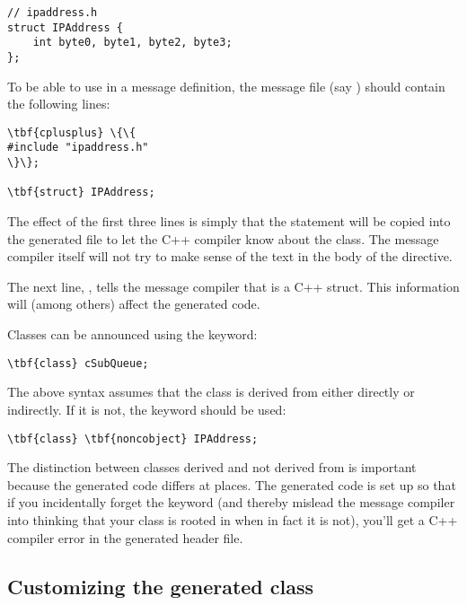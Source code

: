 \begin{verbatim}
// ipaddress.h
struct IPAddress {
    int byte0, byte1, byte2, byte3;
};
\end{verbatim}

To be able to use  in a message definition, the message
file (say ) should contain the following lines:

\begin{Verbatim}[commandchars=\\\{\}]
\tbf{cplusplus} \{\{
#include "ipaddress.h"
\}\};

\tbf{struct} IPAddress;
\end{Verbatim}

The effect of the first three lines is simply that the 
statement will be copied into the generated 
file to let the C++ compiler know about the  class.
The message compiler itself will not try to make sense of the
text in the body of the  directive.

The next line, , tells the message compiler that
 is a C++ struct. This information will (among others)
affect the generated code.

Classes can be announced using the  keyword:

\begin{Verbatim}[commandchars=\\\{\}]
\tbf{class} cSubQueue;
\end{Verbatim}

The above syntax assumes that the class is derived from 
either directly or indirectly. If it is not, the 
keyword should be used:

\begin{Verbatim}[commandchars=\\\{\}]
\tbf{class} \tbf{noncobject} IPAddress;
\end{Verbatim}

The distinction between classes derived and not derived from 
is important because the generated code differs at places.
The generated code is set up so that if you incidentally
forget the  keyword (and thereby mislead the
message compiler into thinking that your class is rooted in
 when in fact it is not), you'll get a C++ compiler
error in the generated header file.


\subsection{Customizing the generated class}
\label{sec:ch-messages:customizing-generated-class}


